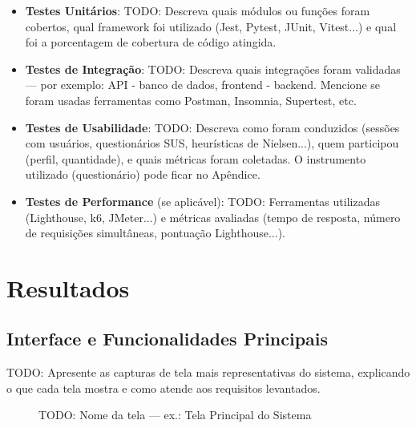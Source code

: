 \begin{itemize}
  \item \textbf{Testes Unitários}:
        TODO: Descreva quais módulos ou funções foram cobertos, qual
        framework foi utilizado (Jest, Pytest, JUnit, Vitest...) e qual
        foi a porcentagem de cobertura de código atingida.

  \item \textbf{Testes de Integração}:
        TODO: Descreva quais integrações foram validadas — por exemplo:
        API - banco de dados, frontend - backend. Mencione se foram
        usadas ferramentas como Postman, Insomnia, Supertest, etc.

  \item \textbf{Testes de Usabilidade}:
        TODO: Descreva como foram conduzidos (sessões com usuários,
        questionários SUS, heurísticas de Nielsen...), quem participou
        (perfil, quantidade), e quais métricas foram coletadas.
        O instrumento utilizado (questionário) pode ficar no Apêndice.

  \item \textbf{Testes de Performance} (se aplicável):
        TODO: Ferramentas utilizadas (Lighthouse, k6, JMeter...) e
        métricas avaliadas (tempo de resposta, número de requisições
        simultâneas, pontuação Lighthouse...).
\end{itemize}


\section{Resultados}
\label{sec:resultados}


\subsection{Interface e Funcionalidades Principais}
\label{subsec:interface}

TODO: Apresente as capturas de tela mais representativas do sistema,
explicando o que cada tela mostra e como atende aos requisitos levantados.

\begin{figure}[H]
  \caption{TODO: Nome da tela — ex.: Tela Principal do Sistema}
  \label{fig:tela-principal}
  \centering
  \fbox{\rule{0pt}{5cm}\rule{0.85\textwidth}{0pt}} %
\end{figure}

